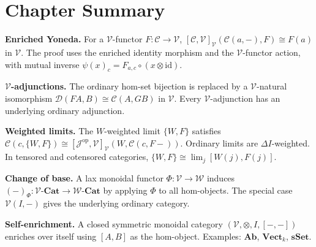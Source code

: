 \begin{exercisesbox}
\begin{qa}
\end{qa}
\end{exercisesbox}


\section*{Chapter Summary}

\begin{summarybox}
\textbf{Enriched Yoneda.} For a $\mathcal{V}$-functor $F : \mathcal{C} \to
\mathcal{V}$, $[\mathcal{C},\mathcal{V}]_\mathcal{V}(\mathcal{C}(a,-), F)
\cong F(a)$ in $\mathcal{V}$. The proof uses the enriched identity morphism
and the $\mathcal{V}$-functor action, with mutual inverse $\psi(x)_c = F_{a,c}
\circ (x \otimes \mathrm{id})$.

\textbf{$\mathcal{V}$-adjunctions.} The ordinary hom-set bijection is replaced
by a $\mathcal{V}$-natural isomorphism $\mathcal{D}(FA,B) \cong \mathcal{C}(A,GB)$
in $\mathcal{V}$. Every $\mathcal{V}$-adjunction has an underlying ordinary
adjunction.

\textbf{Weighted limits.} The $W$-weighted limit $\{W,F\}$ satisfies
$\mathcal{C}(c, \{W,F\}) \cong [\mathcal{J}^{\mathrm{op}},\mathcal{V}]_\mathcal{V}(W,
\mathcal{C}(c, F-))$. Ordinary limits are $\Delta I$-weighted. In tensored and
cotensored categories, $\{W,F\} \cong \lim_j [W(j), F(j)]$.

\textbf{Change of base.} A lax monoidal functor $\Phi : \mathcal{V} \to \mathcal{W}$
induces $(-)_\Phi : \mathcal{V}\text{-}\mathbf{Cat} \to \mathcal{W}\text{-}\mathbf{Cat}$
by applying $\Phi$ to all hom-objects. The special case $\mathcal{V}(I,-)$ gives
the underlying ordinary category.

\textbf{Self-enrichment.} A closed symmetric monoidal category $(\mathcal{V},
\otimes, I, [-,-])$ enriches over itself using $[A,B]$ as the hom-object.
Examples: $\mathbf{Ab}$, $\mathbf{Vect}_k$, $\mathbf{sSet}$.
\end{summarybox}


